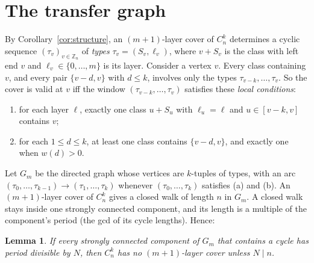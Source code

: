 \documentclass[11pt]{article}
\newtheorem{lemma}[theorem]{Lemma}
\theoremstyle{remark}
\begin{document}
\section{The transfer graph}\label{sec:transfer}
By Corollary~\ref{cor:structure}, an $(m+1)$-layer cover of $C_n^k$ determines a cyclic sequence $(\tau_v)_{v\in\mathbb Z_n}$ of \emph{types} $\tau_v=(S_v,\ell_v)$, where $v+S_v$ is the class with left end $v$ and $\ell_v\in\{0,\dots,m\}$ is its layer. Consider a vertex $v$. Every class containing $v$, and every pair $\{v-d,v\}$ with $d\le k$, involves only the types $\tau_{v-k},\dots,\tau_v$. So the cover is valid at $v$ iff the window $(\tau_{v-k},\dots,\tau_v)$ satisfies these \emph{local conditions}:
\begin{enumerate}
\item[(a)] for each layer $\ell$, exactly one class $u+S_u$ with $\ell_u=\ell$ and $u\in[v-k,v]$ contains $v$;
\item[(b)] for each $1\le d\le k$, at least one class contains $\{v-d,v\}$, and exactly one when $w(d)>0$.
\end{enumerate}
Let $G_m$ be the directed graph whose vertices are $k$-tuples of types, with an arc $(\tau_0,\dots,\tau_{k-1})\to(\tau_1,\dots,\tau_k)$ whenever $(\tau_0,\dots,\tau_k)$ satisfies (a) and (b). An $(m+1)$-layer cover of $C_n^k$ gives a closed walk of length $n$ in $G_m$. A closed walk stays inside one strongly connected component, and its length is a multiple of the component's period (the gcd of its cycle lengths). Hence:

\begin{lemma}\label{lem:period}
If every strongly connected component of $G_m$ that contains a cycle has period divisible by $N$, then $C_n^k$ has no $(m+1)$-layer cover unless $N\mid n$.
\end{lemma}
\end{document}
